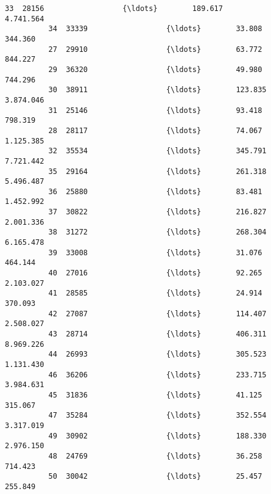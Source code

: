 \documentclass[11pt]{article}
\begin{document}
\begin{Verbatim}[commandchars=\\\{\}]
          33  28156                  {\ldots}        189.617             4.741.564             
          34  33339                  {\ldots}        33.808              344.360               
          27  29910                  {\ldots}        63.772              844.227               
          29  36320                  {\ldots}        49.980              744.296               
          30  38911                  {\ldots}        123.835             3.874.046             
          31  25146                  {\ldots}        93.418              798.319               
          28  28117                  {\ldots}        74.067              1.125.385             
          32  35534                  {\ldots}        345.791             7.721.442             
          35  29164                  {\ldots}        261.318             5.496.487             
          36  25880                  {\ldots}        83.481              1.452.992             
          37  30822                  {\ldots}        216.827             2.001.336             
          38  31272                  {\ldots}        268.304             6.165.478             
          39  33008                  {\ldots}        31.076              464.144               
          40  27016                  {\ldots}        92.265              2.103.027             
          41  28585                  {\ldots}        24.914              370.093               
          42  27087                  {\ldots}        114.407             2.508.027             
          43  28714                  {\ldots}        406.311             8.969.226             
          44  26993                  {\ldots}        305.523             1.131.430             
          46  36206                  {\ldots}        233.715             3.984.631             
          45  31836                  {\ldots}        41.125              315.067               
          47  35284                  {\ldots}        352.554             3.317.019             
          49  30902                  {\ldots}        188.330             2.976.150             
          48  24769                  {\ldots}        36.258              714.423               
          50  30042                  {\ldots}        25.457              255.849               
          

\end{Verbatim}
\end{document}
